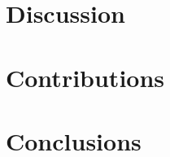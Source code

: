 \documentclass[11pt]{article}
\begin{document}
\begin{multicols}{2}
      \section{Discussion}

      \section{Contributions}

      \section{Conclusions}

      
      

\end{multicols}
\end{document}
